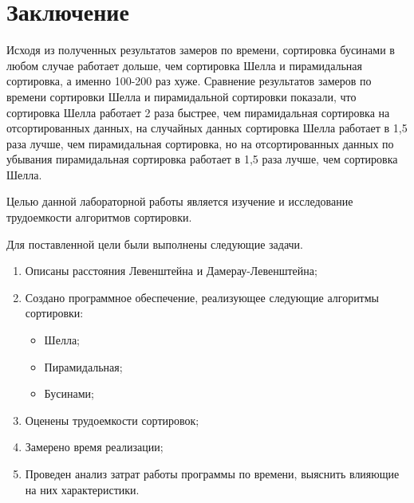 \chapter*{Заключение}

Исходя из полученных результатов замеров по времени, сортировка бусинами в любом случае работает дольше, чем сортировка Шелла и пирамидальная сортировка, а именно 100-200 раз хуже. Сравнение результатов замеров по времени сортировки Шелла и пирамидальной сортировки показали, что сортировка Шелла работает 2 раза быстрее, чем пирамидальная сортировка на отсортированных данных, на случайных данных сортировка Шелла работает в 1,5 раза лучше, чем пирамидальная сортировка, но на отсортированных данных по убывания пирамидальная сортировка работает в 1,5 раза лучше, чем сортировка Шелла.

Целью данной лабораторной работы является изучение и исследование трудоемкости алгоритмов сортировки.

Для поставленной цели были выполнены следующие задачи.
\begin{enumerate}[label={\arabic*)}]
	\item Описаны расстояния Левенштейна и Дамерау-Левенштейна;
	\item Создано программное обеспечение, реализующее следующие алгоритмы сортировки:
	\begin{itemize}[label=---]
		\item Шелла;
		\item Пирамидальная;
		\item Бусинами;
	\end{itemize}
	\item Оценены трудоемкости сортировок;
	\item Замерено время реализации;
	\item Проведен анализ затрат работы программы по времени, выяснить влияющие на них характеристики.
\end{enumerate}
